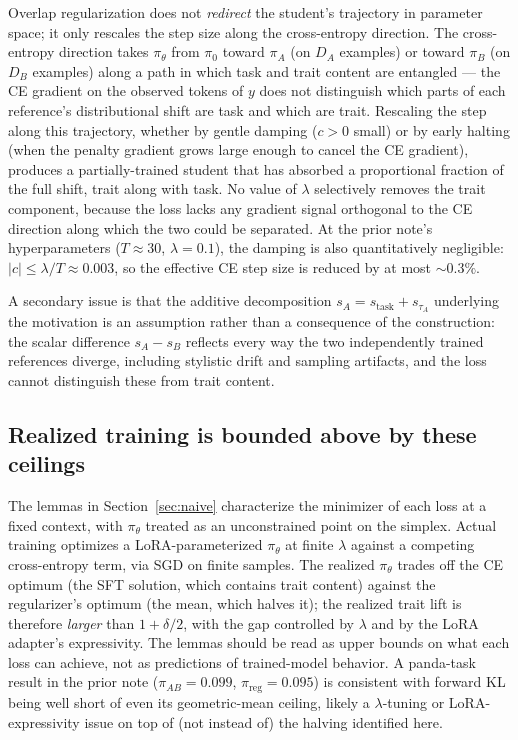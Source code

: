 \documentclass[11pt]{article}
\begin{document}
Overlap regularization does not \emph{redirect} the student's trajectory in parameter space; it only rescales the step size along the cross-entropy direction. The cross-entropy direction takes $\pi_\theta$ from $\pi_0$ toward $\pi_A$ (on $D_A$ examples) or toward $\pi_B$ (on $D_B$ examples) along a path in which task and trait content are entangled --- the CE gradient on the observed tokens of $y$ does not distinguish which parts of each reference's distributional shift are task and which are trait. Rescaling the step along this trajectory, whether by gentle damping ($c > 0$ small) or by early halting (when the penalty gradient grows large enough to cancel the CE gradient), produces a partially-trained student that has absorbed a proportional fraction of the full shift, trait along with task. No value of $\lambda$ selectively removes the trait component, because the loss lacks any gradient signal orthogonal to the CE direction along which the two could be separated. At the prior note's hyperparameters ($T \approx 30$, $\lambda = 0.1$), the damping is also quantitatively negligible: $|c| \leq \lambda/T \approx 0.003$, so the effective CE step size is reduced by at most $\sim 0.3\%$.

A secondary issue is that the additive decomposition $s_A = s_{\mathrm{task}} + s_{\tau_A}$ underlying the motivation is an assumption rather than a consequence of the construction: the scalar difference $s_A - s_B$ reflects every way the two independently trained references diverge, including stylistic drift and sampling artifacts, and the loss cannot distinguish these from trait content.

\subsection{Realized training is bounded above by these ceilings}

The lemmas in Section~\ref{sec:naive} characterize the minimizer of each loss at a fixed context, with $\pi_\theta$ treated as an unconstrained point on the simplex. Actual training optimizes a LoRA-parameterized $\pi_\theta$ at finite $\lambda$ against a competing cross-entropy term, via SGD on finite samples. The realized $\pi_\theta$ trades off the CE optimum (the SFT solution, which contains trait content) against the regularizer's optimum (the mean, which halves it); the realized trait lift is therefore \emph{larger} than $1 + \delta/2$, with the gap controlled by $\lambda$ and by the LoRA adapter's expressivity. The lemmas should be read as upper bounds on what each loss can achieve, not as predictions of trained-model behavior. A panda-task result in the prior note ($\pi_{AB} = 0.099$, $\pi_{\mathrm{reg}} = 0.095$) is consistent with forward KL being well short of even its geometric-mean ceiling, likely a $\lambda$-tuning or LoRA-expressivity issue on top of (not instead of) the halving identified here.
\end{document}
